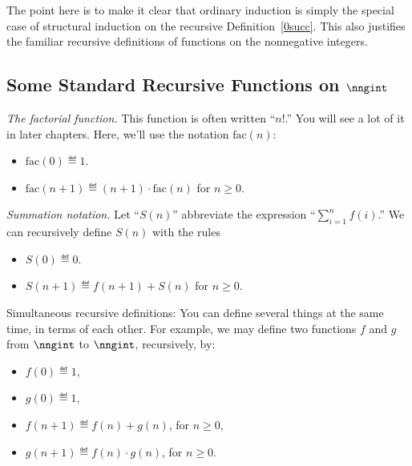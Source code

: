 The point here is to make it clear that ordinary induction is simply the
special case of structural induction on the recursive
Definition~\ref{0succ}.  This also justifies the familiar recursive
definitions of functions on the nonnegative integers.

\subsection{Some Standard Recursive Functions on $\nngint$}

\begin{example}\label{factorial-def}

\emph{The factorial%
 function.}  This function is often written
``$n!$.''  You will see a lot of it in later chapters.  Here, we'll use
the notation $\text{fac}(n)$:
\begin{itemize}
\item $\text{fac}(0) \eqdef 1$.
\item $\text{fac}(n+1) \eqdef (n+1)\cdot \text{fac}(n)$ for $n \ge 0$.
\end{itemize}
\end{example}

\begin{example}
\emph{Summation notation.}\label{sum-notation-def} Let 
``$S(n)$'' abbreviate the expression ``$\sum_{i=1}^n f(i)$.''  We can recursively define
$S(n)$ with the rules
  \begin{itemize}
  \item $S(0) \eqdef 0$.
  \item $S(n+1) \eqdef  f(n+1) + S(n)$ for $n\geq 0$.
  \end{itemize}
\end{example}

\begin{editingnotes}

\item[Simultaneous recursive definitions:]
  You can define several things at the same time, in terms of each
  other.  For example, we may define two functions $f$ and $g$ from
  $\nngint$ to $\nngint$, recursively, by:
  \begin{itemize}
  \item
    $f(0) \eqdef 1$,
  \item
    $g(0) \eqdef 1$,
  \item
    $f(n+1) \eqdef f(n) + g(n)$, for $n \geq 0$,
  \item
    $g(n+1) \eqdef f(n) \cdot g(n)$, for $n \geq 0$.
  \end{itemize}

\end{editingnotes}


